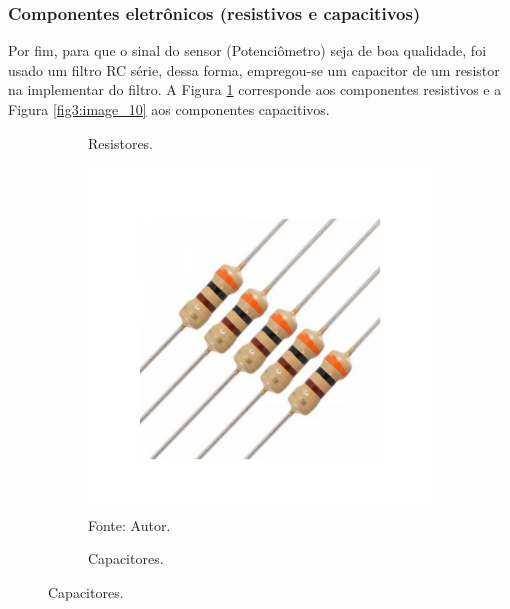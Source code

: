 \newpage
\subsubsection{Componentes eletrônicos (resistivos e capacitivos)}

Por fim, para que o sinal do sensor (Potenciômetro) seja de boa qualidade, foi usado um filtro RC série, dessa forma, empregou-se um capacitor de um resistor na implementar do filtro. A Figura \ref{fig3:image_09} corresponde aos componentes resistivos e a Figura \ref{fig3:image_10} aos componentes capacitivos.

\begin{figure}[!h]
     \centering
     \caption{Componentes eletrônicos.}
     \begin{subfigure}[b]{0.48\textwidth}
         \centering
         \caption{Resistores.}
         \includegraphics[width=\textwidth, page=1]{Capitulos/3_simulacao_e_prototipo/3_figuras/res_cap.pdf}
         \caption*{Fonte: Autor.}
         \label{fig3:image_09}
     \end{subfigure}
     \hfill
     \begin{subfigure}[b]{0.48\textwidth}
         \centering
         \caption{Capacitores.}

\end{subfigure}
\end{figure}
